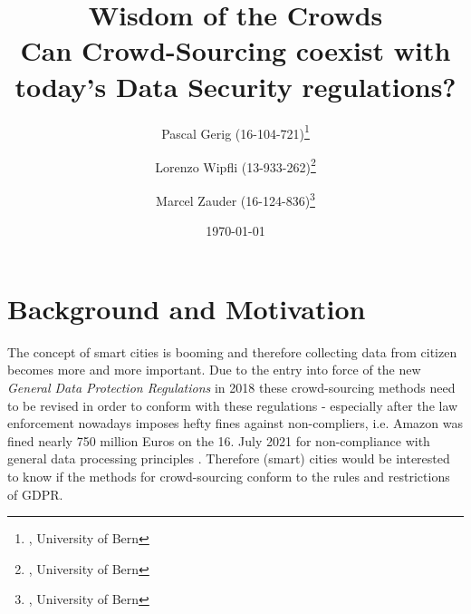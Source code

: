 \documentclass[a4paper,12pt]{article}
\begin{document}

	\title{Wisdom of the Crowds \\ Can Crowd-Sourcing coexist with today's Data Security regulations?} %

	\author{Pascal Gerig (16-104-721)\thanks{, University of Bern}
   		\and Lorenzo Wipfli  (13-933-262)\thanks{, University of Bern}
   		\and Marcel Zauder  (16-124-836)\thanks{, University of Bern}
   	}	%



	\date{\today} %

	\maketitle
	
	\pagestyle{fancy}
	\hfill

	\section{Background and Motivation}
	\startsection
		The concept of smart cities is booming and therefore collecting data from citizen becomes more and more important. Due to the entry into force of the new \textit{General Data Protection Regulations} in 2018 these crowd-sourcing methods need to be revised in order to conform with these regulations - especially after the law enforcement nowadays imposes hefty fines against non-compliers, i.e. Amazon was fined nearly 750 million Euros on the 16. July 2021 for non-compliance with general data processing principles \cite{EnforcementTracker}. Therefore (smart) cities would be interested to know if the methods for crowd-sourcing conform to the rules and restrictions of GDPR.
	\closesection
	
\end{document}
